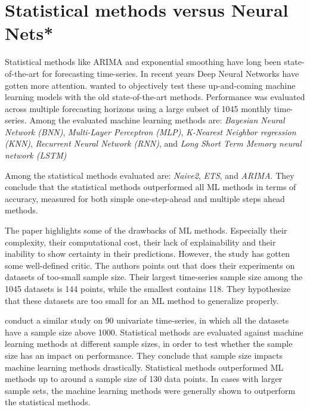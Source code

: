 \section{Statistical methods versus Neural Nets*}
\label{section:RelatedWork:Statistical-NN}

Statistical methods like ARIMA and exponential smoothing have long been state-of-the-art for forecasting time-series.
In recent years Deep Neural Networks have gotten more attention.
\cite{Makridakis2018} wanted to objectively test these up-and-coming machine learning models with the old state-of-the-art methods.
Performance was evaluated across multiple forecasting horizons using a large subset of 1045 monthly time-series.
Among the evaluated machine learning methods are:
\textit{Bayesian Neural Network (BNN)},
\textit{Multi-Layer Perceptron (MLP)},
\textit{K-Nearest Neighbor regression (KNN)},
\textit{Recurrent Neural Network (RNN)}, and
\textit{Long Short Term Memory neural network (LSTM)}


Among the statistical methods evaluated are:
\textit{Naive2},
\textit{ETS}, and
\textit{ARIMA}.
They conclude that the statistical methods outperformed all ML methods in terms of accuracy, measured for both
simple one-step-ahead and multiple steps ahead methods.

The paper \cite{Makridakis2018} highlights some of the drawbacks of ML methods. Especially their complexity, their computational cost,
their lack of explainability and their inability to show certainty in their predictions.
However, the study has gotten some well-defined critic. The authors \citeauthor*{Cerqueira2019} points
out that \cite{Makridakis2018} does their experiments on datasets of too-small sample size.
Their largest time-series sample size among the 1045 datasets is 144 points, while the smallest contains 118.
They hypothesize that these datasets are too small for an ML method to generalize properly.

\cite{Cerqueira2019} conduct a similar study on 90 univariate time-series, in which
all the datasets have a sample size above 1000.
Statistical methods are evaluated against machine learning methods at different sample sizes,
in order to test whether the sample size has an impact on performance.
They conclude that sample size impacts machine learning methods drastically.
Statistical methods outperformed ML methods up to around a sample size of 130 data points.
In cases with larger sample sets, the machine learning methods were generally shown to outperform the statistical methods.

